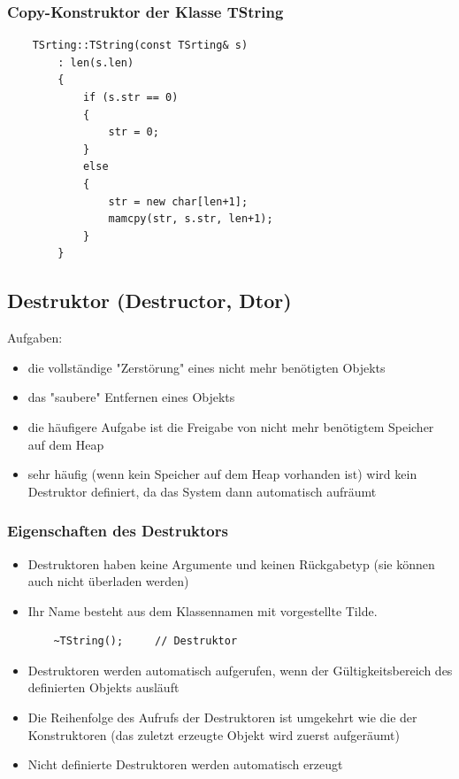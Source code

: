 \subsubsection{Copy-Konstruktor der Klasse TString}
\label{sec:Copy-Konstruktor der Klasse TString}
\noindent
\begin{minipage}{\linewidth}
	\begin{lstlisting}
	TSrting::TString(const TSrting& s)
		: len(s.len)
		{
			if (s.str == 0)
			{
				str = 0;
			}
			else
			{
				str = new char[len+1];
				mamcpy(str, s.str, len+1);
			}
		}
	\end{lstlisting}
\end{minipage}

\subsection{Destruktor (Destructor, Dtor)}
\label{sec:Destruktor (Destructor, Dtor)}
Aufgaben:
\begin{itemize}
	\item die vollständige "Zerstörung" eines nicht mehr benötigten Objekts
	\item das "saubere" Entfernen eines Objekts
	\item die häufigere Aufgabe ist die Freigabe von nicht mehr benötigtem Speicher auf dem Heap
	\item sehr häufig (wenn kein Speicher auf dem Heap vorhanden ist) wird kein Destruktor definiert, da das System dann automatisch aufräumt
\end{itemize}

\subsubsection{Eigenschaften des Destruktors}
\label{sec:Eigenschaften des Destruktors}
\begin{itemize}
	\item Destruktoren haben keine Argumente und keinen Rückgabetyp  (sie können auch nicht überladen werden)
	\item Ihr Name besteht aus dem Klassennamen mit vorgestellte Tilde.
	\begin{lstlisting}
	~TString();		// Destruktor
	\end{lstlisting}
	\item Destruktoren werden automatisch aufgerufen, wenn der Gültigkeitsbereich des definierten Objekts ausläuft
	\item Die Reihenfolge des Aufrufs der Destruktoren ist umgekehrt wie die der Konstruktoren (das zuletzt erzeugte Objekt wird zuerst aufgeräumt)
	\item Nicht definierte Destruktoren werden automatisch erzeugt
\end{itemize}

